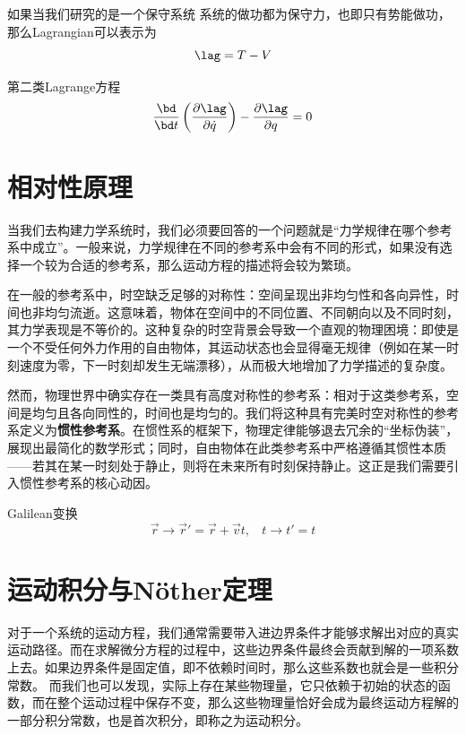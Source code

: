 如果当我们研究的是一个保守系统
系统的做功都为保守力，也即只有势能做功，那么Lagrangian可以表示为
\begin{equation}
    \lag = T - V
\end{equation}

第二类Lagrange方程
\begin{equation}
    \frac{\bd}{\bd t} \left(\frac{\partial\lag}{\partial \dot{q}} \right)-\frac{\partial\lag}{\partial q}  = 0\label{eq:eqomot}
\end{equation}

\section{相对性原理}
\label{sec:Galilean}
当我们去构建力学系统时，我们必须要回答的一个问题就是“力学规律在哪个参考系中成立”。一般来说，力学规律在不同的参考系中会有不同的形式，如果没有选择一个较为合适的参考系，那么运动方程的描述将会较为繁琐。

在一般的参考系中，时空缺乏足够的对称性：空间呈现出非均匀性和各向异性，时间也非均匀流逝。这意味着，物体在空间中的不同位置、不同朝向以及不同时刻，其力学表现是不等价的。这种复杂的时空背景会导致一个直观的物理困境：即使是一个不受任何外力作用的自由物体，其运动状态也会显得毫无规律（例如在某一时刻速度为零，下一时刻却发生无端漂移），从而极大地增加了力学描述的复杂度。

然而，物理世界中确实存在一类具有高度对称性的参考系：相对于这类参考系，空间是均匀且各向同性的，时间也是均匀的。我们将这种具有完美时空对称性的参考系定义为\textbf{惯性参考系}。在惯性系的框架下，物理定律能够退去冗余的“坐标伪装”，展现出最简化的数学形式；同时，自由物体在此类参考系中严格遵循其惯性本质——若其在某一时刻处于静止，则将在未来所有时刻保持静止。这正是我们需要引入惯性参考系的核心动因。

Galilean变换
\begin{equation}
    \vec{r} \rightarrow \vec{r}'= \vec{r} +\vec{v}t,~~~~t \rightarrow t' = t
\end{equation}

\begin{figure}[h]
    
\end{figure}



\section{运动积分与N\"other定理}
\label{sec:noether_theo}
对于一个系统的运动方程，我们通常需要带入进边界条件才能够求解出对应的真实运动路径。而在求解微分方程的过程中，这些边界条件最终会贡献到解的一项系数上去。如果边界条件是固定值，即不依赖时间时，那么这些系数也就会是一些积分常数。
而我们也可以发现，实际上存在某些物理量，它只依赖于初始的状态的函数，而在整个运动过程中保存不变，那么这些物理量恰好会成为最终运动方程解的一部分积分常数，也是首次积分，即称之为运动积分。

